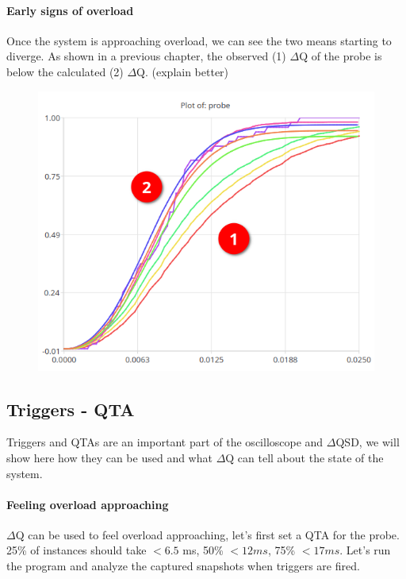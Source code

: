 \paragraph{Early signs of overload}
    
    Once the system is approaching overload, we can see the two means starting to diverge. As shown in a previous chapter, the observed (1) $\Delta$Q of the probe is below the calculated (2) $\Delta$Q. (explain better) 
    \begin{figure}[H]
        \begin{center}
            \includegraphics[scale=0.6]{img/diverging11.png}
        \end{center}
    \end{figure}

    \subsection{Triggers - QTA}
        Triggers and QTAs are an important part of the oscilloscope and $\Delta$QSD, we will show here how they can be used and what $\Delta$Q can tell about the state of the system.

        \paragraph{Feeling overload approaching}

        $\Delta$Q can be used to feel overload approaching, let's first set a QTA for the probe. 25\% of instances should take $< 6.5$ ms, 50\% $<12 ms$, 75\% $<17 ms$. Let's run the program and analyze the captured snapshots when triggers are fired. 
         
